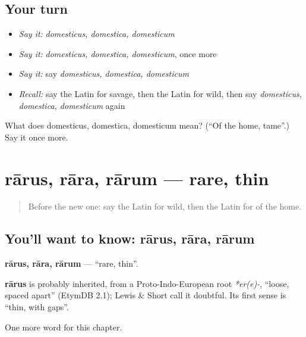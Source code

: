 \subsection*{Your turn}
\begin{itemize}
\raggedright
  \item \emph{Say it:} \emph{domesticus, domestica, domesticum}
  \item \emph{Say it:} \emph{domesticus, domestica, domesticum}, once more
  \item \emph{Say it:} say \emph{domesticus, domestica, domesticum}
  \item \emph{Recall:} say the Latin for savage, then the Latin for wild, then say \emph{domesticus, domestica, domesticum} again
\end{itemize}

\begin{tcolorbox}[breakable,colback=teal!4,colframe=teal!35!black,title={Before you move on}]
What does domesticus, domestica, domesticum mean? (\textquotedblleft{}Of the home, tame\textquotedblright{}.) Say it once more.
\end{tcolorbox}
\section[rārus, rāra, rārum]{rārus, rāra, rārum — rare, thin}

\label{lesson:LA-C214-rarus}



\begin{quote}
Before the new one: say the Latin for wild, then the Latin for of the home.
\end{quote}

\subsection*{You'll want to know: rārus, rāra, rārum}
\textbf{rārus, rāra, rārum} — \textquotedblleft{}rare, thin\textquotedblright{}.

\begin{cousinweb}
\textbf{rārus} is probably inherited, from a Proto-Indo-European root \emph{*er(e)-}, \textquotedblleft{}loose, spaced apart\textquotedblright{} (EtymDB 2.1); Lewis \& Short call it doubtful. Its first sense is \textquotedblleft{}thin, with gaps\textquotedblright{}.
\end{cousinweb}

\begin{grammarlens}[title={What you've built}]
One more word for this chapter.
\end{grammarlens}

